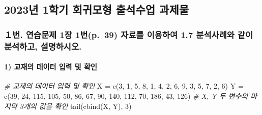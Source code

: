 \documentclass[
]{article}
\author{}
\date{\vspace{-2.5em}2023-04-02}
\newenvironment{Shaded}{\begin{snugshade}}{\end{snugshade}}
\newcommand{\CommentTok}[1]{\textcolor[rgb]{0.56,0.35,0.01}{\textit{#1}}}
\newcommand{\DecValTok}[1]{\textcolor[rgb]{0.00,0.00,0.81}{#1}}
\newcommand{\FunctionTok}[1]{\textcolor[rgb]{0.00,0.00,0.00}{#1}}
\newcommand{\NormalTok}[1]{#1}
\newcommand{\OtherTok}[1]{\textcolor[rgb]{0.56,0.35,0.01}{#1}}
\begin{document}
\hypertarget{uxb144-1uxd559uxae30-uxd68cuxadc0uxbaa8uxd615-uxcd9cuxc11duxc218uxc5c5-uxacfcuxc81cuxbb3c}{%
\subsection{2023년 1학기 회귀모형 출석수업
과제물}\label{uxb144-1uxd559uxae30-uxd68cuxadc0uxbaa8uxd615-uxcd9cuxc11duxc218uxc5c5-uxacfcuxc81cuxbb3c}}

\hypertarget{uxbc88.-uxc5f0uxc2b5uxbb38uxc81c-1uxc7a5-1uxbc88p.-39-uxc790uxb8ccuxb97c-uxc774uxc6a9uxd558uxc5ec-1.7-uxbd84uxc11duxc0acuxb840uxc640-uxac19uxc774-uxbd84uxc11duxd558uxace0-uxc124uxba85uxd558uxc2dcuxc624.}{%
\subsubsection{１번. 연습문제 1장 1번(p.~39) 자료를 이용하여 1.7
분석사례와 같이 분석하고,
설명하시오.}\label{uxbc88.-uxc5f0uxc2b5uxbb38uxc81c-1uxc7a5-1uxbc88p.-39-uxc790uxb8ccuxb97c-uxc774uxc6a9uxd558uxc5ec-1.7-uxbd84uxc11duxc0acuxb840uxc640-uxac19uxc774-uxbd84uxc11duxd558uxace0-uxc124uxba85uxd558uxc2dcuxc624.}}

\hypertarget{uxad50uxc7acuxc758-uxb370uxc774uxd130-uxc785uxb825-uxbc0f-uxd655uxc778}{%
\paragraph{1) 교재의 데이터 입력 및
확인}\label{uxad50uxc7acuxc758-uxb370uxc774uxd130-uxc785uxb825-uxbc0f-uxd655uxc778}}

\begin{Shaded}
\begin{Highlighting}[]
\CommentTok{\# 교재의 데이터 입력 및 확인}
\NormalTok{X }\OtherTok{=} \FunctionTok{c}\NormalTok{(}\DecValTok{3}\NormalTok{, }\DecValTok{1}\NormalTok{, }\DecValTok{5}\NormalTok{, }\DecValTok{8}\NormalTok{, }\DecValTok{1}\NormalTok{, }\DecValTok{4}\NormalTok{, }\DecValTok{2}\NormalTok{, }\DecValTok{6}\NormalTok{, }\DecValTok{9}\NormalTok{, }\DecValTok{3}\NormalTok{, }\DecValTok{5}\NormalTok{, }\DecValTok{7}\NormalTok{, }\DecValTok{2}\NormalTok{, }\DecValTok{6}\NormalTok{)}
\NormalTok{Y }\OtherTok{=} \FunctionTok{c}\NormalTok{(}\DecValTok{39}\NormalTok{, }\DecValTok{24}\NormalTok{, }\DecValTok{115}\NormalTok{, }\DecValTok{105}\NormalTok{, }\DecValTok{50}\NormalTok{, }\DecValTok{86}\NormalTok{, }\DecValTok{67}\NormalTok{, }\DecValTok{90}\NormalTok{, }\DecValTok{140}\NormalTok{, }\DecValTok{112}\NormalTok{, }\DecValTok{70}\NormalTok{, }\DecValTok{186}\NormalTok{, }\DecValTok{43}\NormalTok{, }\DecValTok{126}\NormalTok{)}
\CommentTok{\# X, Y 두 변수의 마지막 3개의 값을 확인}
\FunctionTok{tail}\NormalTok{(}\FunctionTok{cbind}\NormalTok{(X, Y), }\DecValTok{3}\NormalTok{) }
\end{Highlighting}
\end{Shaded}
\end{document}
